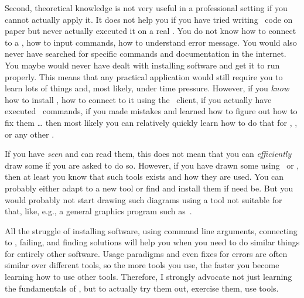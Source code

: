 Second, theoretical knowledge is not very useful in a professional setting if you cannot actually apply it.
It does not help you if you have tried writing \sql\ code on paper but never actually executed it on a real \dbms.
You do not know how to connect to a \dbms, how to input commands, how to understand error message.
You would also never have searched for specific commands and documentation in the internet.
You maybe would never have dealt with installing software and get it to run properly.
This means that any practical application would still require you to learn lots of things and, most likely, under time pressure.
However, if you \emph{know} how to install \postgresql, how to connect to it using the \psql\ client, if you actually have executed \sql\ commands, if you made mistakes and learned how to figure out how to fix them {\dots} then most likely you can relatively quickly learn how to do that for \mysql, \mariadb, or any other \dbms.

If you have \emph{seen}  and can read them, this does not mean that you can \emph{efficiently} draw some if you are asked to do so.
However, if you have drawn some using \yEd\ or \pgmodeler, then at least you know that such tools exists and how they are used.
You can probably either adapt to a new tool or find and install them if need be.
But you would probably not start drawing such diagrams using a tool not suitable for that, like, e.g., a general graphics program such as~\inkscape.

All the struggle of installing software, using command line arguments, connecting  to , failing, and finding solutions will help you when you need to do similar things for entirely other software.
Usage paradigms and even fixes for errors are often similar over different tools, so the more tools you use, the faster you become learning how to use other tools.
Therefore, I strongly advocate not just learning the fundamentals of , but to actually try them out, exercise them, use tools.


